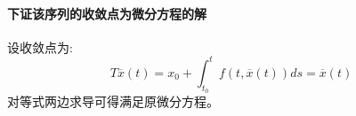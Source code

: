 \documentclass[11pt]{article}
\begin{document}
\begin{CJK*}{UTF8}{gbsn}
\paragraph{下证该序列的收敛点为微分方程的解}设收敛点为:
\begin{equation}
	T\overline{x}(t)=x_0+\int_{t_0}^{t}f(t,\overline{x}(t))ds=\overline{x}(t)
\end{equation}
对等式两边求导可得满足原微分方程。

\end{CJK*}
\end{document}
